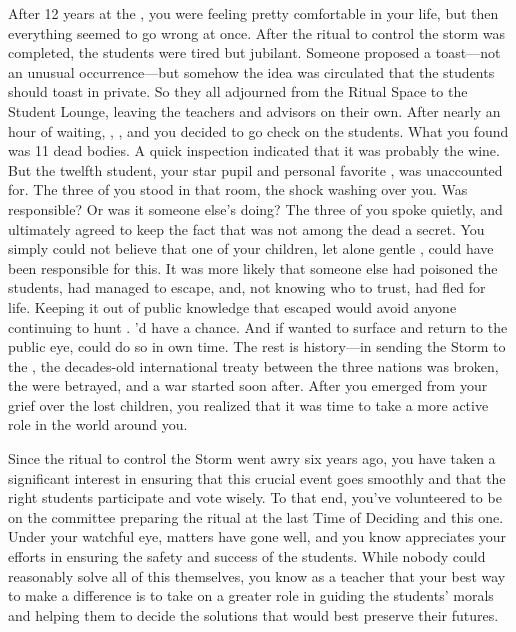 \documentclass[char]{GL2020}
\begin{document}
After 12 years at the \pSchool{}, you were feeling pretty comfortable in your life, but then everything seemed to go wrong at once. After the ritual to control the storm was completed, the students were tired but jubilant. Someone proposed a toast---not an unusual occurrence---but somehow the idea was circulated that the students should toast in private. So they all adjourned from the Ritual Space to the Student Lounge, leaving the teachers and advisors on their own. After nearly an hour of waiting, \cDiplomat{\full}, \cPrincipal{\full}, and you decided to go check on the students. What you found was 11 dead bodies. A quick inspection indicated that it was probably the wine. But the twelfth student, your star pupil and personal favorite \cKidScientist{\full}, was unaccounted for. The three of you stood in that room, the shock washing over you. Was \cKidScientist{} responsible? Or was it someone else's doing? The three of you spoke quietly, and ultimately agreed to keep the fact that \cKidScientist{} was not among the dead a secret. You simply could not believe that one of your children, let alone gentle \cKidScientist{}, could have been responsible for this. It was more likely that someone else had poisoned the students, \cKidScientist{} had managed to escape, and, not knowing who to trust, had fled for \cKidScientist{\their} life. Keeping it out of public knowledge that \cKidScientist{\they} escaped would avoid anyone continuing to hunt \cKidScientist{\them}. \cKidScientist{\They}'d have a chance. And if \cKidScientist{\they} wanted to surface and return to the public eye, \cKidScientist{\they} could do so in \cKidScientist{\their} own time. The rest is history---in sending the Storm to the \pShip{}, the decades-old international treaty between the three nations was broken, the \pShip{} were betrayed, and a war started soon after. After you emerged from your grief over the lost children, you realized that it was time to take a more active role in the world around you.

Since the ritual to control the Storm went awry six years ago, you have taken a significant interest in ensuring that this crucial event goes smoothly and that the right students participate and vote wisely. To that end, you've volunteered to be on the committee preparing the ritual at the last Time of Deciding and this one. Under your watchful eye, matters have gone well, and you know \cPrincipal{\full} appreciates your efforts in ensuring the safety and success of the students. While nobody could reasonably solve all of this themselves, you know as a teacher that your best way to make a difference is to take on a greater role in guiding the students' morals and helping them to decide the solutions that would best preserve their futures.
\end{document}
